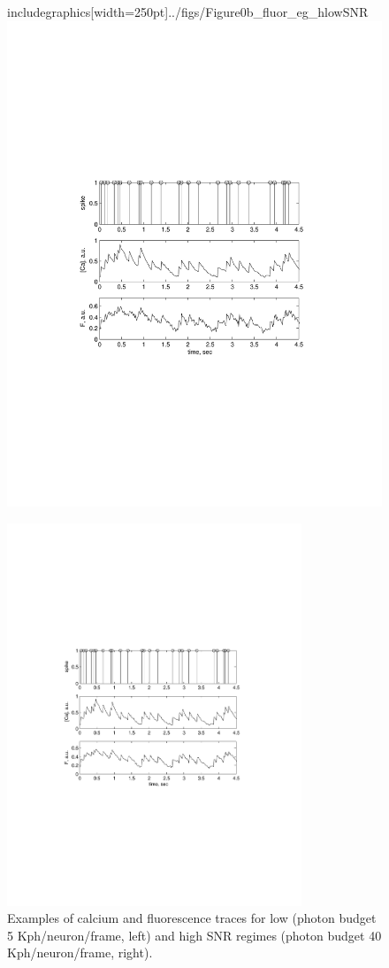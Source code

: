 \begin{figure}
\centering
\begin{minipage}[c]{0.45\hsize}
includegraphics[width=250pt]{../figs/Figure0b_fluor_eg_hlowSNR}
\includegraphics{../figs/Figure0b_fluor_eg_hlowSNR}
\end{minipage}
\begin{minipage}[c]{0.45\hsize}
\includegraphics[width=250pt]{../figs/Figure0a_fluor_eg_highSNR}
\end{minipage}
\caption{Examples of calcium and fluorescence traces for low (photon budget 5 Kph/neuron/frame, left)
and high SNR regimes (photon budget 40 Kph/neuron/frame, right).}
\label{fig:egfluor}
\end{figure}